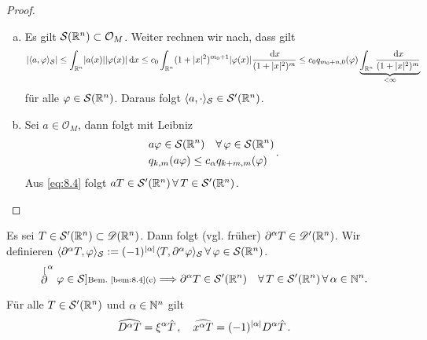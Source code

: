 \begin{proof}
\begin{enumerate}[(a)]
\item Es gilt $\mathcal S(\mathbb{R}^n) \subset \mathcal O_M$. Weiter rechnen wir nach, dass gilt
\begin{dmath*}
	\abs{\<a,\varphi\>_{\mathcal S}} \leq \int_{\R^n} \abs{a(x)} \abs{\varphi(x)} \d x 
	\leq c_0 \int_{\R^n} (1+\abs x^2)^{m_0 +1} \abs{\varphi(x)} \frac{\d x}{(1+\abs x^2)^m} 
	\leq c_0 q_{m_0+n, 0} (\varphi) \underbrace{\int_{\R^n} \frac{\d x}{(1+\abs x^2)^m}}_{< \infty}
\end{dmath*}
für alle $\varphi \in \mathcal S(\mathbb{R}^n)$. Daraus folgt $\langle a, \cdot \rangle_{\mathcal S} \in \mathcal S'(\mathbb{R}^n)$.
\item Sei $a \in \mathcal O_M$, dann folgt mit Leibniz
\begin{align}
\label{eq:8.4}
\begin{aligned}
	& a \varphi \in \mathcal S(\mathbb{R}^n) \quad \forall \, \varphi \in \mathcal S(\mathbb{R}^n) \\
	& q_{k,m} (a\varphi) \leq c_\alpha q_{k+m,m}(\varphi)
\end{aligned}
\, .
\end{align}
Aus \eqref{eq:8.4} folgt $aT \in \mathcal S'(\mathbb{R}^n) \, \forall \, T \in \mathcal S'(\mathbb{R}^n)$. 
\qedhere\end{enumerate}
\end{proof}

\begin{bem}
\label{bem:8.15}
Es sei $T \in \mathcal S'(\mathbb{R}^n) \subset\mathscr{D}(\mathbb{R}^n)$. Dann folgt (vgl. früher) $\partial^\alpha T\in \mathscr{D}'(\mathbb{R}^n)$. Wir definieren $\langle \partial^\alpha T, \varphi\rangle_{\mathcal S} := (-1)^{\lvert \alpha\rvert} \langle T,\partial^\alpha \varphi\rangle_{\mathcal S}\, \forall \, \varphi \in \mathcal S(\mathbb{R}^n)$.
\[
	\stackrel[\partial^\alpha \varphi \in \mathcal S]{\scriptsize\text{Bem.~\ref{bem:8.4}(c)}}\Longrightarrow \partial^\alpha T \in \mathcal S'(\mathbb{R}^n) \quad \forall \, T \in \mathcal S'(\mathbb{R}^n) \, \forall \, \alpha\in\mathbb{N}^n .
\]
\end{bem}

\begin{kor}
\label{kor:8.16}
Für alle $T \in \mathcal S'(\mathbb{R}^n)$ und  $\alpha \in \mathbb{N}^n$ gilt
\[
	\widehat{D^\alpha T} = \xi^\alpha \hat T\, , \quad \widehat{x^\alpha T} = (-1)^{\lvert \alpha\rvert} D^\alpha \hat T \, .
\]
\end{kor}

